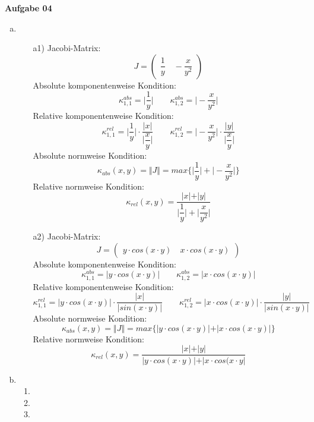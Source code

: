 \documentclass[a4paper,10pt]{article}
\begin{document}
	\newpage
	\textbf{Aufgabe 04}\\
	\begin{enumerate}[a)]
		\item
			\begin{enumerate}
				\item[a1)]
				Jacobi-Matrix:
				\[
				J = 
				\begin{pmatrix}
					\dfrac{1}{y} \quad -\dfrac{x}{y^2}
				\end{pmatrix}
				\]
				Absolute komponentenweise Kondition:
				\[
				\kappa^{abs}_{1,1} = \Big\vert \dfrac{1}{y} \Big\vert \quad\quad \kappa^{abs}_{1,2} = \Big\vert -\dfrac{x}{y^2} \Big \vert
				\]
				Relative komponentenweise Kondition:
				\[
				\kappa^{rel}_{1,1} = \Big\vert \dfrac{1}{y}\Big\vert \cdot \dfrac{\vert x \vert}{\Big \vert \dfrac{x}{y} \Big\vert} \quad\quad \kappa^{rel}_{1,2} = \Big\vert -\dfrac{x}{y^2}\Big\vert \cdot \dfrac{\vert y \vert}{\Big \vert \dfrac{x}{y} \Big\vert}
				\]
				Absolute normweise Kondition:
				\[
				\kappa_{abs}(x,y) = \Vert J \Vert = max\{\Big\vert \dfrac{1}{y} \Big\vert + \Big\vert -\dfrac{x}{y^2} \Big \vert\}
				\]
				Relative normweise Kondition:
				\[
				\kappa_{rel}(x,y) = \dfrac{\vert x \vert + \vert y \vert}{\Big\vert \dfrac{1}{y} \Big\vert + \Big\vert \dfrac{x}{y^2} \Big \vert}
				\]
				\item[a2)]
				Jacobi-Matrix:
				\[
				J = 
				\begin{pmatrix}
					y \cdot cos(x \cdot y) \quad x \cdot cos(x \cdot y)
				\end{pmatrix}
				\]
				Absolute komponentenweise Kondition:
				\[
				\kappa^{abs}_{1,1} = \Big\vert y \cdot cos(x \cdot y) \Big\vert \quad\quad \kappa^{abs}_{1,2} = \Big\vert x \cdot cos(x \cdot y) \Big \vert
				\]
				Relative komponentenweise Kondition:
				\[
				\kappa^{rel}_{1,1} = \Big\vert y \cdot cos(x \cdot y) \Big\vert \cdot \dfrac{\vert x \vert}{\Big \vert sin(x \cdot y) \Big\vert} \quad\quad \kappa^{rel}_{1,2} = \Big\vert x \cdot cos(x \cdot y) \Big\vert \cdot \dfrac{\vert y \vert}{\Big \vert sin(x \cdot y) \Big\vert}
				\]
				Absolute normweise Kondition:
				\[
				\kappa_{abs}(x,y) = \Vert J \Vert = max\{\vert y \cdot cos(x \cdot y)\vert + \vert x \cdot cos(x \cdot y) \vert\}
				\]
				Relative normweise Kondition:
				\[
				\kappa_{rel}(x,y) = \dfrac{\vert x \vert + \vert y \vert}{\vert y \cdot cos(x \cdot y) \vert + \vert x \cdot cos(x \cdot y \vert}
				\]
			\end{enumerate}
				\item
			\begin{enumerate}
				\item
				\item
				\item
			\end{enumerate}


	\end{enumerate}
	
	
\end{document}
